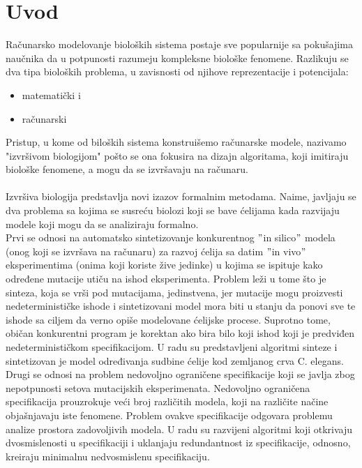 \documentclass[a4paper]{article}
\begin{document}
\section{Uvod}
\label{sec:uvod}
Računarsko modelovanje bioloških sistema postaje sve popularnije sa pokušajima naučnika da u potpunosti razumeju kompleksne biološke fenomene.
Razlikuju se dva tipa bioloških problema, u zavisnosti od njihove reprezentacije i potencijala:
\begin{itemize}
\item matematički i
\item računarski
\end{itemize} 
Pristup, u kome od biloških sistema konstruišemo računarske modele, nazivamo "izvršivom biologijom" pošto se ona fokusira na dizajn algoritama, koji imitiraju biološke fenomene, a mogu da se izvršavaju na računaru.\cite{execbio} \\\\
Izvršiva biologija predstavlja novi izazov formalnim metodama.
Naime, javljaju se dva problema sa kojima se susreću biolozi koji se bave ćelijama kada razvijaju modele koji mogu da se analiziraju formalno.\\ Prvi se odnosi na automatsko sintetizovanje konkurentnog $"$in silico$"$ modela (onog koji se izvršava na računaru) za razvoj ćelija sa datim $"$in vivo$"$ eksperimentima (onima koji koriste žive jedinke) u kojima se ispituje kako određene mutacije utiču na ishod eksperimenta. Problem leži u tome što je sinteza, koja se vrši pod mutacijama, jedinstvena, jer mutacije mogu proizvesti nedeterminističke ishode i sintetizovani model mora biti u stanju da ponovi sve te ishode sa ciljem da verno opiše modelovane ćelijske procese. Suprotno tome, običan konkurentni program je korektan ako bira bilo koji ishod koji je predviđen nedeterminističkom specifikacijom. U radu su predstavljeni algoritmi sinteze i sintetizovan je model određivanja sudbine ćelije kod zemljanog crva C. elegans. \\
Drugi se odnosi na problem nedovoljno ograničene specifikacije koji se javlja zbog nepotpunosti setova mutacijskih eksperimenata. Nedovoljno ograničena specifikacija prouzrokuje veći broj različitih modela, koji na različite načine objašnjavaju iste fenomene. Problem ovakve specifikacije odgovara problemu analize prostora zadovoljivih modela. U radu su razvijeni algoritmi koji otkrivaju dvosmislenosti u specifikaciji i uklanjaju redundantnost iz specifikacije, odnosno, kreiraju minimalnu nedvosmislenu specifikaciju.
\end{document}
